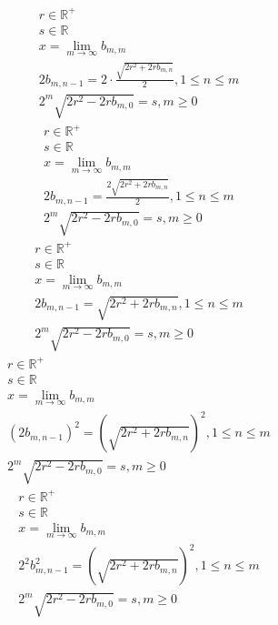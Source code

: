 \documentclass[a4paper,12pt]{report}
\begin{document}
\begin{subequations}
\begin{gather}
r \in \mathbb{R}^+ \\
s \in \mathbb{R} \\
x = \lim \limits_{m \to \infty} b_{m,m} \\
2b_{m,n-1} = 2 \cdot \frac{\sqrt{2r^2 + 2rb_{m,n}}}{2}, 1 \leq n \leq m \\
2^m \sqrt{2r^2 - 2rb_{m,0}} = s, m \geq 0
\end{gather}
\end{subequations}
\begin{subequations}
\begin{gather}
r \in \mathbb{R}^+ \\
s \in \mathbb{R} \\
x = \lim \limits_{m \to \infty} b_{m,m} \\
2b_{m,n-1} = \frac{2 \sqrt{2r^2 + 2rb_{m,n}}}{2}, 1 \leq n \leq m \\
2^m \sqrt{2r^2 - 2rb_{m,0}} = s, m \geq 0
\end{gather}
\end{subequations}
\begin{subequations}
\begin{gather}
r \in \mathbb{R}^+ \\
s \in \mathbb{R} \\
x = \lim \limits_{m \to \infty} b_{m,m} \\
2b_{m,n-1} = \sqrt{2r^2 + 2rb_{m,n}}, 1 \leq n \leq m \\
2^m \sqrt{2r^2 - 2rb_{m,0}} = s, m \geq 0
\end{gather}
\end{subequations}
\begin{subequations}
\begin{gather}
r \in \mathbb{R}^+ \\
s \in \mathbb{R} \\
x = \lim \limits_{m \to \infty} b_{m,m} \\
(2b_{m,n-1})^2 = \left(\sqrt{2r^2 + 2rb_{m,n}}\right)^2, 1 \leq n \leq m \\
2^m \sqrt{2r^2 - 2rb_{m,0}} = s, m \geq 0
\end{gather}
\end{subequations}
\begin{subequations}
\begin{gather}
r \in \mathbb{R}^+ \\
s \in \mathbb{R} \\
x = \lim \limits_{m \to \infty} b_{m,m} \\
2^2b_{m,n-1}^2 = \left(\sqrt{2r^2 + 2rb_{m,n}}\right)^2, 1 \leq n \leq m \\
2^m \sqrt{2r^2 - 2rb_{m,0}} = s, m \geq 0
\end{gather}
\end{subequations}
\end{document}
